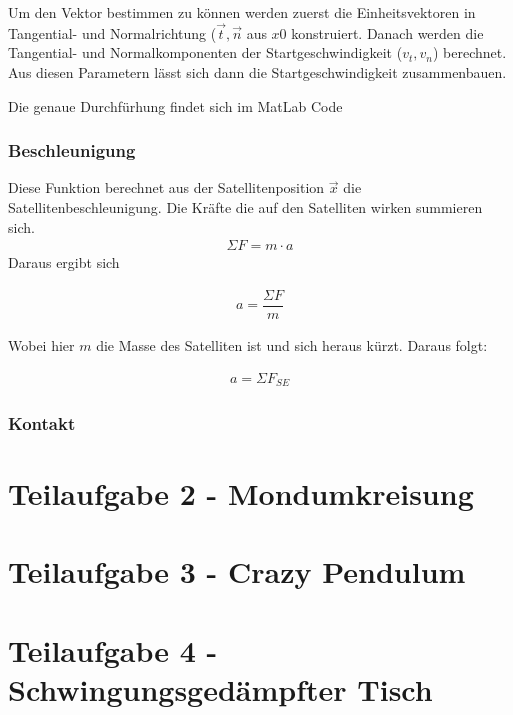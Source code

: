 \documentclass[]{scrartcl}
\begin{document}
Um den Vektor bestimmen zu können werden zuerst die Einheitsvektoren in Tangential- und Normalrichtung ($\vec{t}, \vec{n}$ aus $x0$ konstruiert. Danach werden die Tangential- und Normalkomponenten der Startgeschwindigkeit ($v_t , v_n$) berechnet. Aus diesen Parametern lässt sich dann die Startgeschwindigkeit zusammenbauen.

Die genaue Durchfürhung findet sich im MatLab Code

\subsubsection{Beschleunigung}
Diese Funktion berechnet aus der Satellitenposition $\vec{x}$ die Satellitenbeschleunigung.
Die Kräfte die auf den Satelliten wirken summieren sich. 
\begin{align}
\Sigma{F} = m \cdot a
\end{align}
Daraus ergibt sich 

\begin{align}
a = \dfrac{\Sigma{F}}{m}
\end{align}

Wobei hier $m$ die Masse des Satelliten ist und sich heraus kürzt. Daraus folgt:

\begin{align}
a = \Sigma{F}_{SE}
\end{align}



\subsubsection{Kontakt}


\section{Teilaufgabe 2 - Mondumkreisung}

\section{Teilaufgabe 3 - Crazy Pendulum}

\section{Teilaufgabe 4 - Schwingungsgedämpfter Tisch}
\end{document}
